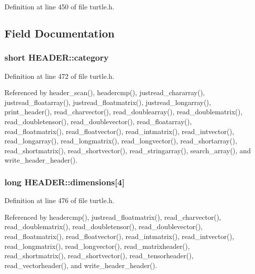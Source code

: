  

Definition at line 450 of file turtle.\-h.



\subsection{Field Documentation}
\hypertarget{struct_h_e_a_d_e_r_a85307f8d3e87cf1948d552e7d8439494}{
\subsubsection[{category}]{\setlength{\rightskip}{0pt plus 5cm}short H\-E\-A\-D\-E\-R\-::category}}\label{struct_h_e_a_d_e_r_a85307f8d3e87cf1948d552e7d8439494}


Definition at line 472 of file turtle.\-h.



Referenced by header\-\_\-scan(), headercmp(), justread\-\_\-chararray(), justread\-\_\-floatarray(), justread\-\_\-floatmatrix(), justread\-\_\-longarray(), print\-\_\-header(), read\-\_\-charvector(), read\-\_\-doublearray(), read\-\_\-doublematrix(), read\-\_\-doubletensor(), read\-\_\-doublevector(), read\-\_\-floatarray(), read\-\_\-floatmatrix(), read\-\_\-floatvector(), read\-\_\-intmatrix(), read\-\_\-intvector(), read\-\_\-longarray(), read\-\_\-longmatrix(), read\-\_\-longvector(), read\-\_\-shortarray(), read\-\_\-shortmatrix(), read\-\_\-shortvector(), read\-\_\-stringarray(), search\-\_\-array(), and write\-\_\-header\-\_\-header().

\hypertarget{struct_h_e_a_d_e_r_a4af1ef7685e17799673dcada494933a3}{
\subsubsection[{dimensions}]{\setlength{\rightskip}{0pt plus 5cm}long H\-E\-A\-D\-E\-R\-::dimensions\mbox{[}4\mbox{]}}}\label{struct_h_e_a_d_e_r_a4af1ef7685e17799673dcada494933a3}


Definition at line 476 of file turtle.\-h.



Referenced by headercmp(), justread\-\_\-floatmatrix(), read\-\_\-charvector(), read\-\_\-doublematrix(), read\-\_\-doubletensor(), read\-\_\-doublevector(), read\-\_\-floatmatrix(), read\-\_\-floatvector(), read\-\_\-intmatrix(), read\-\_\-intvector(), read\-\_\-longmatrix(), read\-\_\-longvector(), read\-\_\-matrixheader(), read\-\_\-shortmatrix(), read\-\_\-shortvector(), read\-\_\-tensorheader(), read\-\_\-vectorheader(), and write\-\_\-header\-\_\-header().

